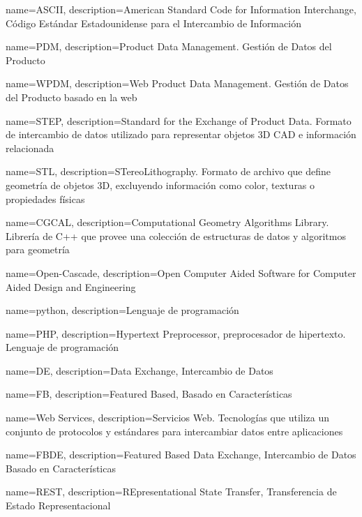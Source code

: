 {
    name=ASCII,
    description={American Standard Code for Information Interchange, Código Estándar Estadounidense para el Intercambio de Información}
}


{
    name=PDM,
    description={Product Data Management. Gestión de Datos del Producto}
}

{
    name=WPDM,
    description={Web Product Data Management. Gestión de Datos del Producto basado en la web}
}


{
    name=STEP,
    description={Standard for the Exchange of Product Data. Formato de intercambio de datos utilizado para representar objetos 3D CAD e información relacionada}
}

{
    name=STL,
    description={STereoLithography. Formato de archivo que define geometría de objetos 3D, excluyendo información como color, texturas o propiedades físicas}
}

{
    name=CGCAL,
    description={Computational Geometry Algorithms Library. Librería de C++ que provee una colección de estructuras de datos  y algoritmos para geometría}
}

{
    name=Open-Cascade,
    description={Open Computer Aided Software for Computer Aided Design and Engineering}
}

{
    name=python,
    description={Lenguaje de programación}
}

{
    name=PHP,
    description={Hypertext Preprocessor, preprocesador de hipertexto. Lenguaje de programación}
}

{
    name=DE,
    description={Data Exchange, Intercambio de Datos}
}

{
    name=FB,
    description={Featured Based, Basado en Características}
}

{
    name=Web Services,
    description={Servicios Web. Tecnologías que utiliza un conjunto de protocolos y estándares para intercambiar datos entre aplicaciones}
}

{
    name=FBDE,
    description={Featured Based Data Exchange, Intercambio de Datos Basado en Características}
}


{
    name=REST,
    description={REpresentational State Transfer, Transferencia de Estado Representacional}
}


